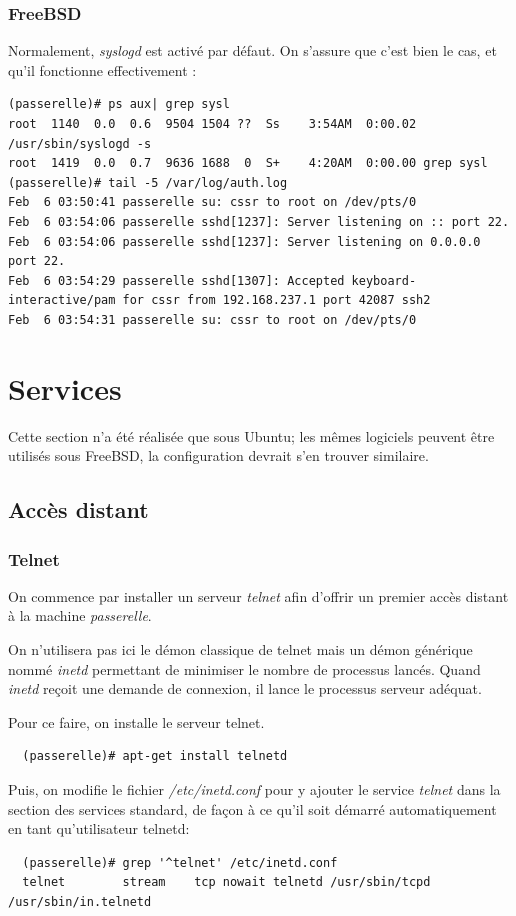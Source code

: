 \documentclass[a4paper]{article}
\begin{document}
\subsubsection{FreeBSD}
Normalement, \textit{syslogd} est activé par défaut. On s'assure que c'est
bien le cas, et qu'il fonctionne effectivement :
\begin{verbatim}
(passerelle)# ps aux| grep sysl
root  1140  0.0  0.6  9504 1504 ??  Ss    3:54AM  0:00.02 /usr/sbin/syslogd -s
root  1419  0.0  0.7  9636 1688  0  S+    4:20AM  0:00.00 grep sysl
(passerelle)# tail -5 /var/log/auth.log
Feb  6 03:50:41 passerelle su: cssr to root on /dev/pts/0
Feb  6 03:54:06 passerelle sshd[1237]: Server listening on :: port 22.
Feb  6 03:54:06 passerelle sshd[1237]: Server listening on 0.0.0.0 port 22.
Feb  6 03:54:29 passerelle sshd[1307]: Accepted keyboard-interactive/pam for cssr from 192.168.237.1 port 42087 ssh2
Feb  6 03:54:31 passerelle su: cssr to root on /dev/pts/0
\end{verbatim}

\section{Services}
Cette section n'a été réalisée que sous Ubuntu; les mêmes logiciels
peuvent être utilisés sous FreeBSD, la configuration devrait s'en
trouver similaire.
\subsection{Accès distant}
\subsubsection{Telnet}

On commence par installer un serveur \textit{telnet} afin d'offrir
un premier accès distant à la machine \textit{passerelle}.

On n'utilisera pas ici le démon classique de telnet mais un démon
générique nommé \textit{inetd} permettant de minimiser le nombre
de processus lancés. Quand \textit{inetd} reçoit une demande 
de connexion, il lance le processus serveur adéquat. 

Pour ce faire, on installe le serveur telnet.
\begin{verbatim}
  (passerelle)# apt-get install telnetd
\end{verbatim}

Puis, on modifie le fichier \textit{/etc/inetd.conf} pour y
ajouter le service \textit{telnet} dans la section des services
standard, de façon à ce qu'il soit démarré automatiquement
en tant qu'utilisateur telnetd:
\begin{verbatim}
  (passerelle)# grep '^telnet' /etc/inetd.conf
  telnet        stream    tcp nowait telnetd /usr/sbin/tcpd /usr/sbin/in.telnetd
\end{verbatim}
\end{document}
